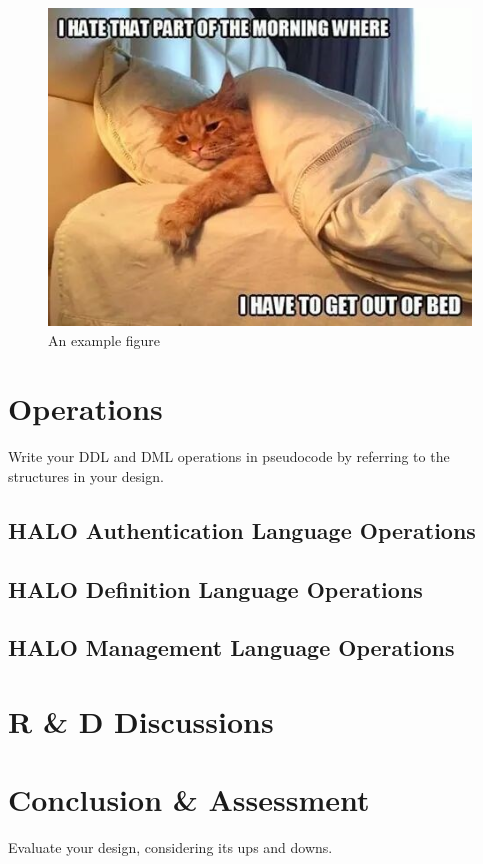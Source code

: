 \documentclass{article}
\begin{document}
\begin{figure}[H]
    \centering
    \includegraphics[width=.8\textwidth]{figures/download.jpg}
    \caption{An example figure}
\end{figure}

\section{Operations}
\label{sec:operations}
Write your DDL and DML operations in pseudocode by referring to the structures in your design.
\subsection{HALO Authentication Language Operations}

\subsection{HALO Definition Language Operations}

\subsection{HALO Management Language Operations}

\section{R \& D Discussions}

\section{Conclusion \& Assessment}
\label{sec:conclusion}
Evaluate your design, considering its ups and downs. 
\end{document}
